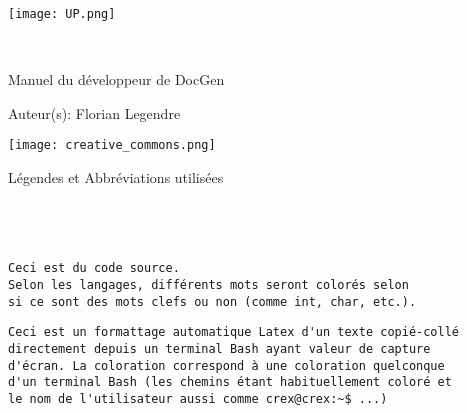 \documentclass[a4paper, french]{report}
\begin{document}
\begin{titlepage}
    \begin{flushleft}
        \texttt{[image: UP.png]}\par
        \centering
        
        \vspace{13\baselineskip}       
        \HRule \\[0.4cm]

        {\Huge 
        Manuel du développeur de DocGen\par}
        \vspace{0.4cm}
        \HRule
        \vfill
      
        Auteur(s): Florian Legendre\medskip \par
        
        \texttt{[image: creative\_commons.png]}\par
    \end{flushleft}
\end{titlepage}

\newpage
\begin{LARGE}
Légendes et Abbréviations utilisées\\\\\\\\
\end{LARGE}

\begin{lstlisting}[style=C, caption=Exemple de code source]
Ceci est du code source.
Selon les langages, différents mots seront colorés selon 
si ce sont des mots clefs ou non (comme int, char, etc.).
\end{lstlisting}

\begin{mdframed}[style=Bash]
\begin{lstlisting}[style=Bash, caption=Exemple d'une pseudo capture d'écran Bash]
Ceci est un formattage automatique Latex d'un texte copié-collé
directement depuis un terminal Bash ayant valeur de capture
d'écran. La coloration correspond à une coloration quelconque 
d'un terminal Bash (les chemins étant habituellement coloré et 
le nom de l'utilisateur aussi comme crex@crex:~$ ...)
\end{lstlisting}
\end{mdframed}


\newpage
\pagestyle{empty}
\setcounter{tocdepth}{3}
\tableofcontents
{}
\pagestyle{plain}
\end{document}
